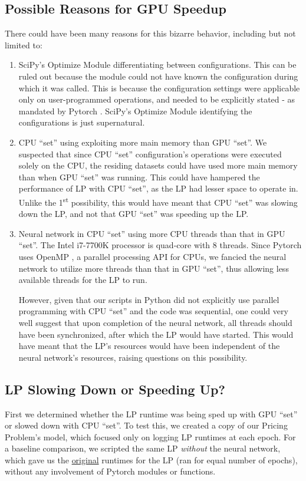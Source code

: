 \begin{appendices}
    \subsection{Possible Reasons for GPU Speedup} \label{app:Possible Reasons for GPU Speedup}
    There could have been many reasons for this bizarre behavior, including but not limited to:
    \begin{enumerate}
        \item SciPy's Optimize Module differentiating between configurations. This can be ruled out because the module could not have known the configuration during which it was called. This is because the configuration settings were applicable only on user-programmed operations, and needed to be explicitly stated - as mandated by Pytorch \cite{PTDocs}. SciPy's Optimize Module identifying the configurations is just supernatural.
        \item CPU ``set'' using exploiting more main memory than GPU ``set''. We suspected that since CPU ``set'' configuration's operations were executed solely on the CPU, the residing datasets could have used more main memory than when GPU ``set'' was running. This could have hampered the performance of LP with CPU ``set'', as the LP had lesser space to operate in. Unlike the 1\textsuperscript{st} possibility, this would have meant that CPU ``set'' was slowing down the LP, and not that GPU ``set'' was speeding up the LP.
        \item Neural network in CPU ``set'' using more CPU threads than that in GPU ``set''. The Intel i7-7700K processor is quad-core with 8 threads. Since Pytorch uses OpenMP \cite{PTDocs}, a parallel processing API for CPUs, we fancied the neural network to utilize more threads than that in GPU ``set'', thus allowing less available threads for the LP to run. 
        
        However, given that our scripts in Python did not explicitly use parallel programming with CPU ``set'' and the code was sequential, one could very well suggest that upon completion of the neural network, all threads should have been synchronized, after which the LP would have started. This would have meant that the LP's resources would have been independent of the neural network's resources, raising questions on this possibility.
    \end{enumerate}

    \subsection{LP Slowing Down or Speeding Up?} \label{app:LP Slowing Down or Speeding Up?}
    First we determined whether the LP runtime was being sped up with GPU ``set'' or slowed down with CPU ``set''. To test this, we created a copy of our Pricing Problem's model, which focused only on logging LP runtimes at each epoch. For a baseline comparison, we scripted the same LP \textit{without} the neural network, which gave us the \underline{original} runtimes for the LP (ran for equal number of epochs), without any involvement of Pytorch modules or functions. 
    

\end{appendices}
